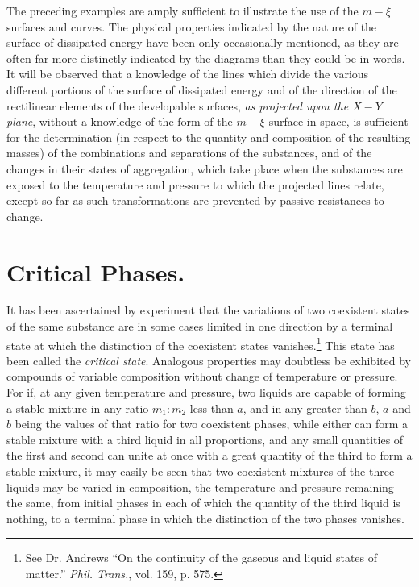 \documentclass[12pt]{article}
\begin{document}
The preceding examples are amply sufficient to illustrate the use of the $m\!-\xi$ surfaces and curves. The physical properties indicated by the nature of the surface of dissipated energy have been only occasionally mentioned, as they are often far more distinctly indicated by the diagrams than they could be in words. It will be observed that a knowledge of the lines which divide the various different portions of the surface of dissipated energy and of the direction of the rectilinear elements of the developable surfaces, \textit{as projected upon the $X\!-Y$ plane}, without a knowledge of the form of the $m\!-\xi$ surface in space, is sufficient for the determination (in respect to the quantity and composition of the resulting masses) of the combinations and separations of the substances, and of the changes in their states of aggregation, which take place when the substances are exposed to the temperature and pressure to which the projected lines relate, except so far as such transformations are prevented by passive resistances to change.

\section{Critical Phases.}
It has been ascertained by experiment that the variations of two coexistent states of the same substance are in some cases limited in one direction by a terminal state at which the distinction of the coexistent states vanishes.\footnote{See Dr. Andrews ``On the continuity of the gaseous and liquid states of matter.'' \textit{Phil. Trans.}, vol. 159, p. 575.} This state has been called the \textit{critical state}. Analogous properties may doubtless be exhibited by compounds of variable composition without change of temperature or pressure. For if, at any given temperature and pressure, two liquids are capable of forming a stable mixture in any ratio $m_1 : m_2$ less than $a$, and in any greater than $b$, $a$ and $b$ being the values of that ratio for two coexistent phases, while either can form a stable mixture with a third liquid in all proportions, and any small quantities of the first and second can unite at once with a great quantity of the third to form a stable mixture, it may easily be seen that two coexistent mixtures of the three liquids may be varied in composition, the temperature and pressure remaining the same, from initial phases in each of which the quantity of the third liquid is nothing, to a terminal phase in which the distinction of the two phases vanishes.\
\end{document}
